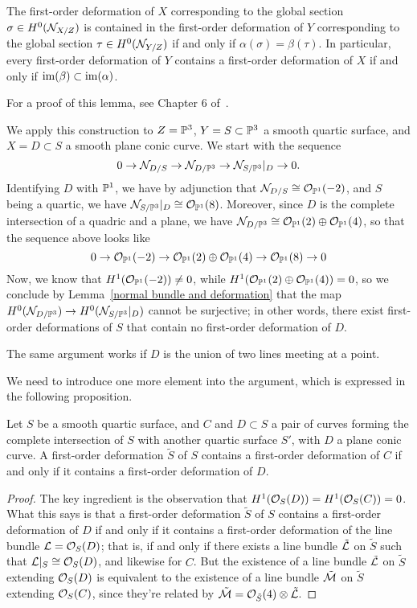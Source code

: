\begin{lemma}\label{normal bundle and deformation}
The first-order deformation of $X$ corresponding to the global section $\sigma \in H^0(\cN_{X/Z})$ is contained in the first-order deformation of $Y$ corresponding to the global section $\tau \in H^0(\cN_{Y/Z})$ if and only if $\alpha(\sigma) = \beta(\tau)$. In particular, every first-order deformation of $Y$ contains a first-order deformation of $X$ if and only if $\im(\beta) \subset \im(\alpha)$.
\end{lemma} 

For a proof of this lemma, see Chapter 6 of~\cite{3264}.

We apply this construction to $Z = \PP^3$, $Y = S \subset \PP^3$ a smooth quartic surface, and $X = D \subset S$ a smooth plane conic curve. We start with the sequence
$$
0 \to \cN_{D/S} \to \cN_{D/\PP^3} \to \cN_{S/\PP^3}|_D \to 0.
$$
Identifying $D$ with $\PP^1$, we have by adjunction that $\cN_{D/S} \cong \cO_{\PP^1}(-2)$, and $S$ being a quartic, we have $\cN_{S/\PP^3}|_D \cong \cO_{\PP^1}(8)$. Moreover, since $D$ is the complete intersection of a quadric and a plane, we have $\cN_{D/\PP^3} \cong \cO_{\PP^1}(2) \oplus  \cO_{\PP^1}(4)$, so that the sequence above looks like
$$
0 \to \cO_{\PP^1}(-2) \to \cO_{\PP^1}(2) \oplus \cO_{\PP^1}(4) \to \cO_{\PP^1}(8) \to 0
$$
Now, we know that $H^1(\cO_{\PP^1}(-2)) \neq 0$, while $H^1(\cO_{\PP^1}(2) \oplus \cO_{\PP^1}(4)) = 0$, so we conclude by Lemma~\ref{normal bundle and deformation} that the map
$H^0(\cN_{D/\PP^3}) \to H^0(\cN_{S/\PP^3}|_D)$ cannot be surjective; in other words, there exist first-order deformations of $S$ that contain no first-order deformation of $D$.

The same argument works if $D$ is the union of two lines meeting at a point.

We need to introduce one more element into the argument, which is expressed in the following proposition.

\begin{proposition}
Let $S$ be a smooth quartic surface, and $C$ and $D \subset S$ a pair of curves forming the complete intersection of $S$ with another quartic surface $S'$, with $D$ a plane conic curve. A first-order deformation $\tilde S$ of $S$ contains a first-order deformation of $C$ if and only if it contains a first-order deformation of $D$.
\end{proposition}

\begin{proof}
The key ingredient is the observation that $H^1(\cO_S(D)) = H^1(\cO_S(C)) = 0$. What this says is that a first-order deformation $\tilde S$ of $S$ contains a first-order deformation of $D$ if and only if it contains a first-order deformation of the line bundle $\cL = \cO_S(D)$; that is, if and only if there exists a line bundle $\tilde \cL$ on $\tilde S$ such that $\cL|_S \cong \cO_S(D)$, and likewise for $C$. But the existence of a line bundle $\tilde \cL$ on $\tilde S$ extending $\cO_S(D)$ is equivalent to the existence of a line bundle $\tilde \cM$ on $\tilde S$ extending $\cO_S(C)$, since they're related by $\tilde \cM = \cO_{\tilde S}(4) \otimes \tilde \cL$.
\end{proof}

